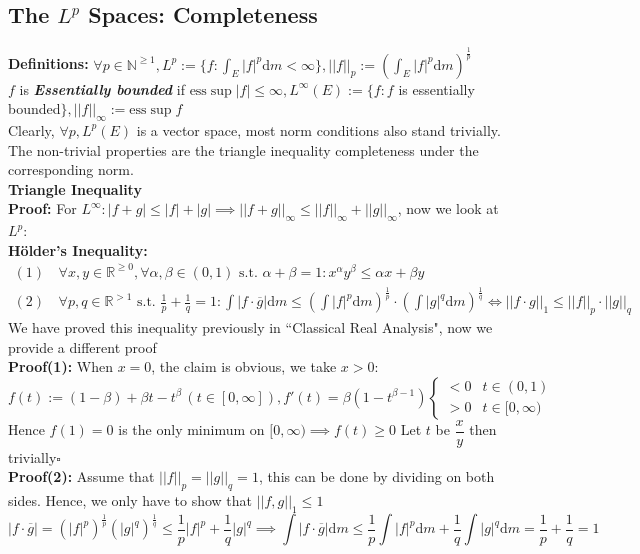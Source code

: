 \documentclass{article}
\newcommand{\R}{\mathbb{R}}
\newcommand{\N}{\mathbb{N}}
\newcommand{\st}{\mbox{ s.t. }}
\newcommand{\0}{{\bf{0}}}
\newcommand{\1}{{\bf{1}}}
\newcommand{\esssup}{\mbox{ess}\sup\limits}
\newcommand{\dint}{\displaystyle\int}
\newcommand{\dif}{\mbox{d}}
\begin{document}
\subsection{The $L^p$ Spaces: Completeness}
\textbf{Definitions:} $\forall p\in\N^{\geq1},L^p:=\{f:\dint_E|f|^p\dif m<\infty\},||f||_p:=(\dint_E|f|^p\dif m)^\frac{1}{p}$\\
$f$ is \textit{\textbf{Essentially bounded}} if $\esssup|f|\le\infty,L^\infty(E):=\{f:f$ is essentially bounded$\},||f||_\infty:=\esssup f$\\
Clearly, $\forall p,L^p(E)$ is a vector space, most norm conditions also stand trivially. The non-trivial properties are the triangle inequality completeness under the corresponding norm.\\
\textbf{Triangle Inequality}\\
\textbf{Proof:} For $L^\infty:|f+g|\le|f|+|g|\implies||f+g||_\infty\le||f||_\infty+||g||_\infty$, now we look at $L^p$:\\
\textbf{Hölder's Inequality:} 
\begin{equation}
\begin{split}
    (1)\,&\forall x,y\in\R^{\geq0},\forall\alpha,\beta\in(0,1)\st\alpha+\beta=1:x^\alpha y^\beta\le\alpha x+\beta y\\
    (2)\,&\forall p,q\in\R^{>1}\st\frac{1}{p}+\frac{1}{q}=1:\int|f\cdot\overline{g}|\dif m\le(\int|f|^p\dif m)^\frac{1}{p}\cdot(\int|g|^q\dif m)^\frac{1}{q}\iff||f\cdot g||_1\le||f||_p\cdot||g||_q
\end{split}
\end{equation}
We have proved this inequality previously in ``Classical Real Analysis", now we provide a different proof\\
\textbf{Proof(1):} When $x=0$, the claim is obvious, we take $x>0$:
$$f(t):=(1-\beta)+\beta t-t^\beta\,(t\in[0,\infty]),f'(t)=\beta(1-t^{\beta-1})\begin{cases}
    <0&t\in(0,1)\\
    >0&t\in[0,\infty)
\end{cases}$$
Hence $f(1)=0$ is the only minimum on $[0,\infty)\implies f(t)\geq0$ Let $t$ be $\dfrac{x}{y}$ then trivially\quad$\square$\\
\textbf{Proof(2):} Assume that $||f||_p=||g||_q=1$, this can be done by dividing on both sides. Hence, we only have to show that $||f,g||_1\le1$
$$|f\cdot\overline{g}|=(|f|^p)^\frac{1}{p}(|g|^q)^\frac{1}{q}\le\frac{1}{p}|f|^p+\frac{1}{q}|g|^q\implies\int|f\cdot\overline{g}|\dif m\le\frac{1}{p}\int|f|^p\dif m+\frac{1}{q}\int|g|^q\dif m=\frac{1}{p}+\frac{1}{q}=1$$
\end{document}
